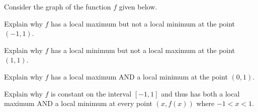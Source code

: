 \documentclass{ximera}
\begin{document}
\begin{problem}
Consider the graph of the function $f$ given below.  

\begin{center}

% 
\end{center}
\end{problem}

\begin{problem}
Explain why $f$ has a local maximum but not a local minimum at the point $(-1, 1)$.




\end{problem}

\begin{problem}
Explain why  $f$ has a local minimum but not a local maximum at the point $(1, 1)$.

\end{problem}

\begin{problem}
Explain why $f$ has a local maximum AND a local minimum at the point $(0, 1)$.
\end{problem}

\begin{problem}
Explain why $f$ is constant on the interval $[-1, 1]$ and thus has both a local maximum AND a local minimum at every point $(x, f(x))$ where $-1 < x < 1$.
\end{problem}
\end{document}
